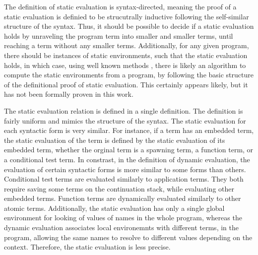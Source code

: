 \documentclass[letterpaper, 11pt]{extarticle}
\begin{document}
The definition of static evaluation is syntax-directed, meaning the proof of a static evaluation
is definied to be strucutrally inductive following the self-similar structure of the syntax.
Thus, it should be possible to decide if a static evaluation holds
by unraveling the program term into smaller and smaller terms,
until reaching a term without any smaller terms.
Additionally, for any given program, there should be instances of static environments,
such that the static evaluation holds, in which case, using well known methods \cite{},
there is likely an algorithm to compute the static environments from a program,
by following the basic structure of the definitional proof of static evaluation.
This certainly appears likely, but it has not been formally proven in this work.

The static evaluation relation is defined in a single definition.
The definition is fairly uniform and mimics the structure of the syntax.
The static evaluation for each syntactic form is very similar.
For instance, if a term has an embedded term,
the static evaluation of the term is defined
by the static evaluation of its embedded term,
whether the orginal term is a spawning term, a function term, or a conditional test term.
In constrast, in the definition of dynamic evaluation,
the evaluation of certain syntactic forms is more similar to some forms than others.
Conditional test terms are evaluated similarly to application terms. They both require
saving some terms on the continuation stack, while evaluating other embedded terms.
Function terms are dynamically evaluated similarly to other atomic terms.
Additionally, the static evaluation has only a single global environment for
looking of values of names in the whole program, whereas the dynamic evaluation
associates local environemnts with different terms, in the program, allowing the same
names to resolve to different values depending on the context. Therefore, the
static evaluation is less precise.
\end{document}
